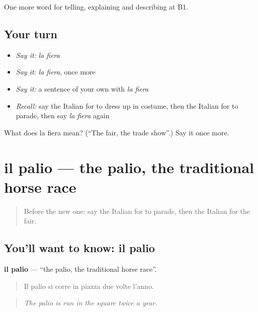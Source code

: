 \begin{grammarlens}[title={What you've built}]
One more word for telling, explaining and describing at B1.
\end{grammarlens}

\subsection*{Your turn}
\begin{itemize}
\raggedright
  \item \emph{Say it:} \emph{la fiera}
  \item \emph{Say it:} \emph{la fiera}, once more
  \item \emph{Say it:} a sentence of your own with \emph{la fiera}
  \item \emph{Recall:} say the Italian for to dress up in costume, then the Italian for to parade, then say \emph{la fiera} again
\end{itemize}

\begin{tcolorbox}[breakable,colback=teal!4,colframe=teal!35!black,title={Before you move on}]
What does la fiera mean? (\textquotedblleft{}The fair, the trade show\textquotedblright{}.) Say it once more.
\end{tcolorbox}
\section[il palio]{il palio — the palio, the traditional horse race}

\label{lesson:IT-C320-palio}



\begin{quote}
Before the new one: say the Italian for to parade, then the Italian for the fair.
\end{quote}

\subsection*{You'll want to know: il palio}
\textbf{il palio} — \textquotedblleft{}the palio, the traditional horse race\textquotedblright{}.

\begin{quote}
Il palio si corre in piazza due volte l'anno.
\end{quote}

\begin{quote}
\emph{The palio is run in the square twice a year.}
\end{quote}

